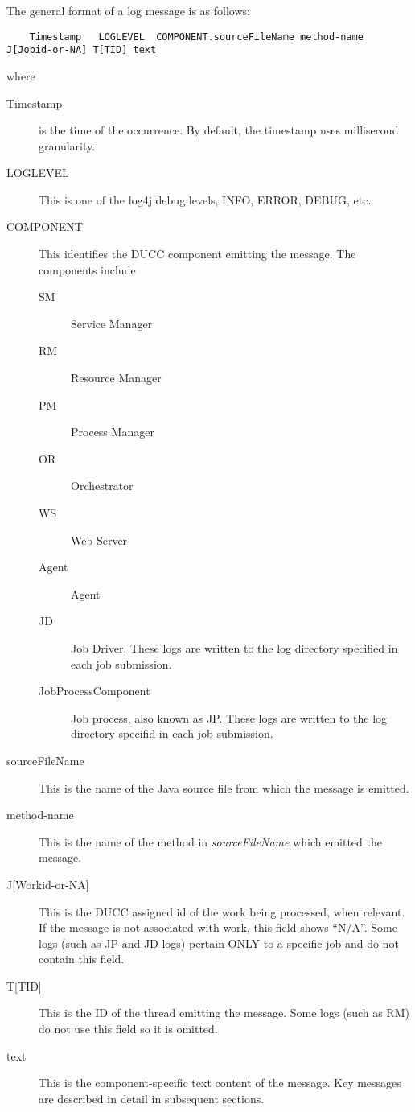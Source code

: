     The general format of a log message is as follows:
\begin{verbatim}
    Timestamp   LOGLEVEL  COMPONENT.sourceFileName method-name J[Jobid-or-NA] T[TID] text
\end{verbatim}
    where
    \begin{description}
      \item[Timestamp] is the time of the occurrence.  By default, the timestamp uses millisecond granularity.
      \item[LOGLEVEL] This is one of the log4j debug levels, INFO, ERROR, DEBUG, etc.
      \item[COMPONENT] This identifies the DUCC component emitting the message.  The components include
        \begin{description}
          \item[SM] Service Manager
          \item[RM] Resource Manager
          \item[PM] Process Manager
          \item[OR] Orchestrator
          \item[WS] Web Server
          \item[Agent] Agent            
          \item[JD] Job Driver.  These logs are written to the log directory specified in each
            job submission.
          \item[JobProcessComponent] Job process, also known as JP.  These logs are written to the
            log directory specifid in each job submission.
        \end{description}
      \item[sourceFileName] This is the name of the Java source file from which the message is emitted.
      \item[method-name] This is the name of the method in {\em sourceFileName} which emitted the message.
      \item[{J[Workid-or-NA]}] This is the DUCC assigned id of the work being processed, when relevant.  If the
        message is not associated with work, this field shows ``N/A''.  Some logs (such as JP and JD logs)
        pertain ONLY to a specific job and do not contain this field.
      \item[{T[TID]}] This is the ID of the thread emitting the message.  Some logs (such as RM) do not use
        this field so it is omitted.
      \item[text] This is the component-specific text content of the message.  Key messages are described
        in detail in subsequent sections.

    \end{description}

